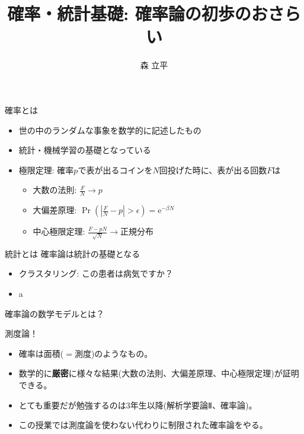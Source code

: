 \documentclass[lualatex,handout]{beamer}
\title{確率・統計基礎: 確率論の初歩のおさらい}
\author{森 立平}
\date{}
\theoremstyle{definition}
\begin{document}
\begin{frame}[plain]
\maketitle
\end{frame}


\begin{frame}{確率とは}
\begin{itemize}
\setlength{\itemsep}{2em}
\item 世の中のランダムな事象を数学的に記述したもの
\item 統計・機械学習の基礎となっている
\item 極限定理: 確率$p$で表が出るコインを$N$回投げた時に、表が出る回数$F$は
\vspace{1em}
\begin{itemize}
\setlength{\itemsep}{1em}
\item 大数の法則: $\frac{F}{N} \to p$
\item 大偏差原理: $\Pr\left(\left|\frac{F}{N} - p\right| > \epsilon\right) = \mathrm{e}^{-\beta N}$
\item 中心極限定理: $\frac{F-pN}{\sqrt{N}}\to$正規分布
\end{itemize}
\end{itemize}
\end{frame}

\begin{frame}{統計とは}
確率論は統計の基礎となる
\vspace{1em}
\begin{itemize}
\item クラスタリング: この患者は病気ですか？
\item a
\end{itemize}
\end{frame}

\begin{frame}{確率論の数学モデルとは？}
\begin{center}
\large 測度論！
\end{center}

\vspace{1em}
\begin{itemize}
\setlength{\itemsep}{2em}
\item 確率は面積($=$測度)のようなもの。
\item 数学的に\textbf{厳密}に様々な結果(大数の法則、大偏差原理、中心極限定理)が証明できる。
\item とても重要だが勉強するのは3年生以降(解析学要論Ⅱ、確率論)。
\item この授業では測度論を使わない代わりに制限された確率論をやる。
\end{itemize}
\end{frame}
\end{document}
